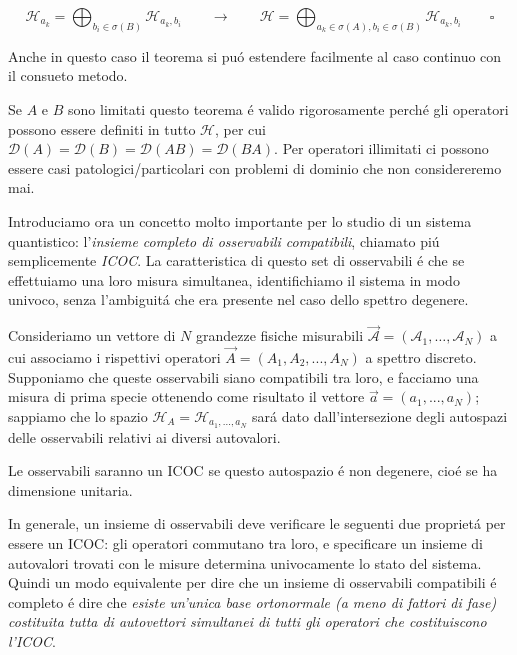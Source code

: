 $$\mathcal{H}_{a_{k}}=\bigoplus_{b_{i}\in\sigma(B)}\mathcal{H}_{a_{k},b_{i}}\qquad\longrightarrow\qquad\mathcal{H}=\bigoplus_{a_{k}\in\sigma(A),b_{i}\in\sigma(B)}\mathcal{H}_{a_{k},b_{i}} \qquad\square$$
	
Anche in questo caso il teorema si pu\'o estendere facilmente al caso continuo con il consueto metodo.

Se $A$ e $B$ sono limitati questo teorema \'e valido rigorosamente perch\'e gli operatori possono essere definiti in tutto $\mathcal{H}$, per cui $\mathcal{D}(A) = \mathcal{D}(B) = \mathcal{D}(AB) = \mathcal{D}(BA)$. Per operatori illimitati ci possono essere casi patologici/particolari con problemi di dominio che non considereremo mai.

Introduciamo ora un concetto molto importante per lo studio di un sistema quantistico: l'\textit{insieme completo di osservabili compatibili}, chiamato pi\'u semplicemente \textit{ICOC}. La caratteristica di questo set di osservabili \'e che se effettuiamo una loro misura simultanea, identifichiamo il sistema in modo univoco, senza l'ambiguit\'a che era presente nel caso dello spettro degenere.

\begin{definizione}
Consideriamo un vettore di $N$ grandezze fisiche misurabili $\vec{\mathcal{A}} = (\mathcal{A}_1, \ldots, \mathcal{A}_N )$ a cui associamo i rispettivi operatori $\vec{A} = (A_1, A_2, ..., A_N )$ a spettro discreto. Supponiamo che queste osservabili siano compatibili tra loro, e facciamo una misura di prima specie ottenendo come risultato il vettore $\vec{a} = (a_1, ..., a_N )$; sappiamo che lo spazio $\mathcal{H}_A = \mathcal{H}_{a_1,...,a_N}$ sar\'a dato dall'intersezione degli autospazi delle osservabili relativi ai diversi autovalori.

Le osservabili saranno un ICOC se questo autospazio \'e non degenere, cio\'e se ha dimensione unitaria.
\end{definizione}

In generale, un insieme di osservabili deve verificare le seguenti due propriet\'a per essere un ICOC: gli operatori commutano tra loro, e specificare un insieme di autovalori trovati con le misure determina univocamente lo stato del sistema. Quindi un modo equivalente per dire che un insieme di osservabili compatibili \'e completo \'e dire che \textit{esiste un'unica base ortonormale (a meno di fattori di fase) costituita tutta di autovettori simultanei di tutti gli operatori che costituiscono l'ICOC}.
	
